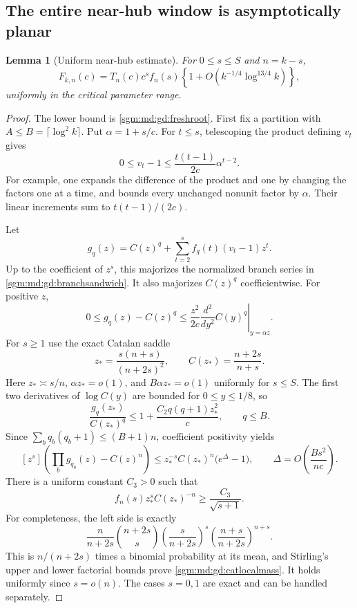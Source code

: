 \documentclass[11pt,letterpaper]{article}
\newtheorem{lemma}[theorem]{Lemma}\newtheorem{proposition}[theorem]{Proposition}\newtheorem{corollary}[theorem]{Corollary}
\theoremstyle{remark}\newtheorem{remark}[theorem]{Remark}
\theoremstyle{definition}\newtheorem{definition}[theorem]{Definition}
\begin{document}
\subsection{The entire near-hub window is asymptotically planar}

\begin{lemma}[Uniform near-hub estimate]\label{sgm:md:gd:rootwindow}
For $0\le s\le S$ and $n=k-s$,
\begin{equation}\label{sgm:md:gd:rootapprox}
 F_{k,n}(c)=T_n(c)c^sf_n(s)
 \left\{1+O\!\left(k^{-1/4}\log^{13/4}k\right)\right\},
\end{equation}
uniformly in the critical parameter range.
\end{lemma}
\begin{proof}
The lower bound is \eqref{sgm:md:gd:freshroot}.  First fix a partition with
$A\le B=\lceil\log^2k\rceil$.  Put $\alpha=1+s/c$.  For $t\le s$,
telescoping the product defining $v_t$ gives
\begin{equation}\label{sgm:md:gd:vtminus}
 0\le v_t-1\le\frac{t(t-1)}{2c}\alpha^{t-2}.
\end{equation}
For example, one expands the difference of the product and one by
changing the factors one at a time, and bounds every unchanged
nonunit factor by $\alpha$.  Their linear increments sum to
$t(t-1)/(2c)$.

Let
\[
 g_q(z)=C(z)^q+\sum_{t=2}^{s}f_q(t)(v_t-1)z^t.
\]
Up to the coefficient of $z^s$, this majorizes the normalized branch
series in \eqref{sgm:md:gd:branchsandwich}.  It also majorizes $C(z)^q$
coefficientwise.  For positive $z$,
\[
 0\le g_q(z)-C(z)^q
 \le\frac{z^2}{2c}
       \left.\frac{d^2}{dy^2}C(y)^q\right|_{y=\alpha z}.
\]
For $s\ge1$ use the exact Catalan saddle
\begin{equation}\label{sgm:md:gd:catsaddle}
 z_* =\frac{s(n+s)}{(n+2s)^2},\qquad
 C(z_*)=\frac{n+2s}{n+s}.
\end{equation}
Here $z_*\asymp s/n$, $\alpha z_*=o(1)$, and
$B\alpha z_*=o(1)$ uniformly for $s\le S$.
The first two derivatives of $\log C(y)$ are bounded for
$0\le y\le1/8$, so
\[
 \frac{g_q(z_*)}{C(z_*)^q}
 \le1+\frac{C_2q(q+1)z_*^2}{c},\qquad q\le B.
\]
Since $\sum_b q_b(q_b+1)\le(B+1)n$, coefficient positivity yields
\begin{equation}\label{sgm:md:gd:positiveerror}
 [z^s]\left(\prod_b g_{q_b}(z)-C(z)^n\right)
 \le z_*^{-s}C(z_*)^n\bigl(e^\Delta-1\bigr),\qquad
 \Delta=O\!\left(\frac{B s^2}{nc}\right).
\end{equation}
There is a uniform constant $C_3>0$ such that
\begin{equation}\label{sgm:md:gd:catlocalmass}
 f_n(s)z_*^sC(z_*)^{-n}\ge\frac{C_3}{\sqrt{s+1}}.
\end{equation}
For completeness, the left side is exactly
\[
 \frac{n}{n+2s}\binom{n+2s}{s}
 \left(\frac{s}{n+2s}\right)^s
 \left(\frac{n+s}{n+2s}\right)^{n+s}.
\]
This is $n/(n+2s)$ times a binomial probability at its mean, and
Stirling's upper and lower factorial bounds prove
\eqref{sgm:md:gd:catlocalmass}.  It holds uniformly since $s=o(n)$.
The cases $s=0,1$ are exact and can be handled separately.


\end{proof}
\end{document}
